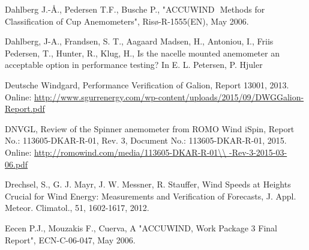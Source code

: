 Dahlberg J.-Å., Pedersen T.F., Busche P., "ACCUWIND ­ Methods for Classification of Cup Anemometers", Risø-R-1555(EN), May 2006.


Dahlberg, J-A., Frandsen, S. T., Aagaard Madsen, H., Antoniou, I., Friis Pedersen, T., Hunter, R., Klug, H., Is the nacelle mounted anemometer an acceptable option in performance testing? In E. L. Petersen, P. Hjuler 

Deutsche Windgard, Performance Verification of Galion, Report 13001, 2013. Online: \url{http://www.sgurrenergy.com/wp-content/uploads/2015/09/DWGGalion-Report.pdf}


DNVGL, Review of the Spinner anemometer from ROMO Wind iSpin, Report No.: 113605-DKAR-R-01, Rev. 3, Document No.: 113605-DKAR-R-01, 2015.           
Online: \small{\url{http://romowind.com/media/113605-DKAR-R-01\\ -Rev-3-2015-03-06.pdf}}


Drechsel, S., G. J. Mayr, J. W. Messner, R. Stauffer, Wind Speeds at Heights Crucial for Wind Energy: Measurements and Verification of Forecasts, J. Appl. Meteor. Climatol., 51, 1602-1617, 2012.


Eecen P.J., Mouzakis F., Cuerva, A "ACCUWIND, Work Package 3 Final Report", ECN-C-06-047, May 2006.


